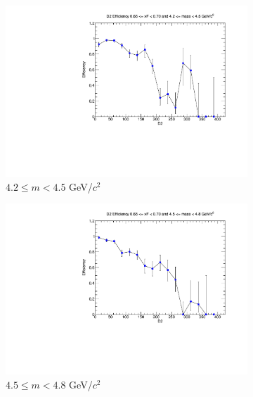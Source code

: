 \begin{figure}[p]
    \centering
    \begin{subfigure}[b]{0.32\textwidth}
        \centering
        \includegraphics[width=\textwidth]{./kTrackerEfficiencyPlots/D2_Efficiency_xF13_mass0.pdf}
        \caption{$4.2 \leq m < 4.5$ GeV/$c^2$}
        \label{fig:xF13_mass0}
    \end{subfigure}
    \hfill
    \begin{subfigure}[b]{0.32\textwidth}
        \centering
        \includegraphics[width=\textwidth]{./kTrackerEfficiencyPlots/D2_Efficiency_xF13_mass1.pdf}
        \caption{$4.5 \leq m < 4.8$ GeV/$c^2$}
        \label{fig:xF13_mass1}
    \end{subfigure}
    \hfill
    \begin{subfigure}[b]{0.32\textwidth}

\end{subfigure}
\end{figure}
